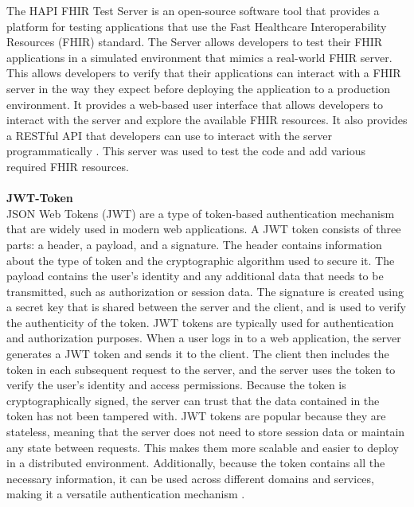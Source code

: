 \documentclass[]{report}
\begin{document}
The HAPI FHIR Test Server is an open-source software tool that provides a platform for testing applications that use the Fast Healthcare Interoperability Resources (FHIR) standard. The Server allows developers to test their FHIR applications in a simulated environment that mimics a real-world FHIR server. This allows developers to verify that their applications can interact with a FHIR server in the way they expect before deploying the application to a production environment. It provides a web-based user interface that allows developers to interact with the server and explore the available FHIR resources. It also provides a RESTful API that developers can use to interact with the server programmatically \cite{hapi-fhir}. This server was used to test the code and add various required FHIR resources.\\\\
\textbf{JWT-Token}\\
JSON Web Tokens (JWT) are a type of token-based authentication mechanism that are widely used in modern web applications. A JWT token consists of three parts: a header, a payload, and a signature. The header contains information about the type of token and the cryptographic algorithm used to secure it. The payload contains the user's identity and any additional data that needs to be transmitted, such as authorization or session data. The signature is created using a secret key that is shared between the server and the client, and is used to verify the authenticity of the token. JWT tokens are typically used for authentication and authorization purposes. When a user logs in to a web application, the server generates a JWT token and sends it to the client. The client then includes the token in each subsequent request to the server, and the server uses the token to verify the user's identity and access permissions. Because the token is cryptographically signed, the server can trust that the data contained in the token has not been tampered with. JWT tokens are popular because they are stateless, meaning that the server does not need to store session data or maintain any state between requests. This makes them more scalable and easier to deploy in a distributed environment. Additionally, because the token contains all the necessary information, it can be used across different domains and services, making it a versatile authentication mechanism \cite{jwt-io}.
\end{document}
